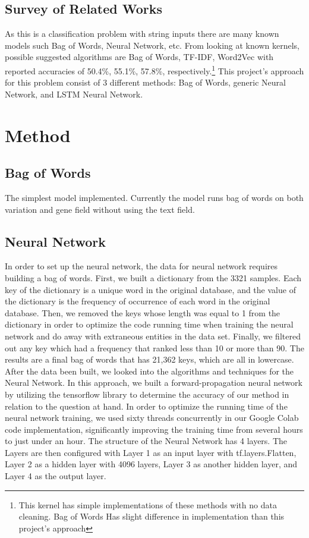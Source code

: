 \documentclass{article}
\begin{document}
    \subsection{Survey of Related Works}
    As this is a classification problem with string inputs there are many known models such Bag of Words, Neural Network, etc.  From looking at known kernels, possible suggested algorithms are Bag of Words, TF-IDF, Word2Vec with reported accuracies of 50.4\%, 55.1\%, 57.8\%, respectively.\footnote{This kernel has simple implementations of these methods with no data cleaning.  Bag of Words Has slight difference in implementation than this project's approach}  This project's approach for this problem consist of 3 different methods: Bag of Words, generic Neural Network, and LSTM Neural Network.  
    
    \section{Method}
    \subsection{Bag of Words}
    The simplest model implemented.  Currently the model runs bag of words on both variation and gene field without using the text field.  
    \subsection{Neural Network}
    In order to set up the neural network, the data for neural network requires building a bag of words. First, we built a dictionary from the 3321 samples. Each key of the dictionary is a unique word in the original database, and the value of the dictionary is the frequency of occurrence of each word in the original database. Then, we removed the keys whose length was equal to 1 from the dictionary in order to optimize the code running time when training the neural network and do away with extraneous entities in the data set. Finally, we filtered out any key which had a frequency that ranked less than 10 or more than 90.  The results are a final bag of words that has 21,362 keys, which are all in lowercase.  After the data been built, we looked into the algorithms and techniques for the Neural Network.  In this approach, we built a forward-propagation neural network by utilizing the tensorflow library to determine the accuracy of our method in relation to the question at hand. In order to optimize the running time of the neural network training, we used sixty threads concurrently in our Google Colab code implementation, significantly improving the training time from several hours to just under an hour. The structure of the Neural Network has 4 layers.  The Layers are then configured with Layer 1 as an input layer with tf.layers.Flatten, Layer 2 as a hidden layer with 4096 layers, Layer 3 as another hidden layer, and Layer 4 as the output layer.  
    
\end{document}
